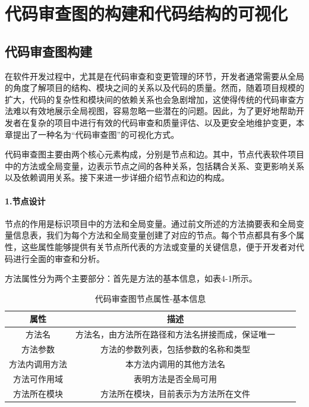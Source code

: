 \section{代码审查图的构建和代码结构的可视化}

\subsection{代码审查图构建}

在软件开发过程中，尤其是在代码审查和变更管理的环节，开发者通常需要从全局的角度了解项目的结构、模块之间的关系以及代码的质量。然而，随着项目规模的扩大，代码的复杂性和模块间的依赖关系也会急剧增加，这使得传统的代码审查方法难以有效地展示全局视图，容易忽略一些潜在的问题。因此，为了更好地帮助开发者在复杂的项目中进行有效的代码审查和质量评估、以及更安全地维护变更，本章提出了一种名为“代码审查图”的可视化方式。

代码审查图主要由两个核心元素构成，分别是节点和边。其中，节点代表软件项目中的方法或全局变量，边表示节点之间的各种关系，包括耦合关系、变更影响关系以及依赖调用关系。接下来进一步详细介绍节点和边的构成。

\paragraph{1.节点设计} 节点的作用是标识项目中的方法和全局变量。通过前文所述的方法摘要表和全局变量信息表，我们为每个方法和全局变量创建了对应的节点。每个节点都具有多个属性，这些属性能够提供有关节点所代表的方法或变量的关键信息，便于开发者对代码进行全面的审查和分析。

方法属性分为两个主要部分：首先是方法的基本信息，如表4-1所示。

\begin{table}[htbp]
\caption{代码审查图节点属性-基本信息}
\vspace{0.5em}\centering\wuhao
\begin{tabular}{cccc}
\toprule
    属性 & 描述 \\
\midrule
方法名 & 方法名，由方法所在路径和方法名拼接而成，保证唯一  \\
方法参数 & 方法的参数列表，包括参数的名称和类型   \\
方法内调用方法 & 本方法内调用的其他方法名   \\
方法可作用域 & 表明方法是否全局可用   \\
方法所在模块 &  方法所在模块，目前表示为方法所在文件  \\ 
\bottomrule
\end{tabular}
\end{table}

